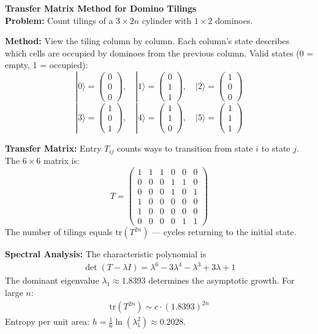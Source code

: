 \begin{technical}
{\Large\textbf{Transfer Matrix Method for Domino Tilings}}\\[0.7em]

\noindent\textbf{Problem:} Count tilings of a $3 \times 2n$ cylinder with $1 \times 2$ dominoes.

\noindent\textbf{Method:} View the tiling column by column. Each column's state describes which cells are occupied by dominoes from the previous column. Valid states (0 = empty, 1 = occupied):
\[
|0\rangle = \begin{pmatrix}0\\0\\0\end{pmatrix}, \quad
|1\rangle = \begin{pmatrix}0\\1\\1\end{pmatrix}, \quad
|2\rangle = \begin{pmatrix}1\\0\\0\end{pmatrix}
\]
\[
|3\rangle = \begin{pmatrix}1\\0\\1\end{pmatrix}, \quad
|4\rangle = \begin{pmatrix}1\\1\\0\end{pmatrix}, \quad
|5\rangle = \begin{pmatrix}1\\1\\1\end{pmatrix}
\]

\noindent\textbf{Transfer Matrix:} Entry $T_{ij}$ counts ways to transition from state $i$ to state $j$. The $6 \times 6$ matrix is:
\[
T = \begin{pmatrix}
1 & 1 & 1 & 0 & 0 & 0 \\
0 & 0 & 0 & 1 & 1 & 0 \\
0 & 0 & 0 & 1 & 0 & 1 \\
1 & 0 & 0 & 0 & 0 & 0 \\
1 & 0 & 0 & 0 & 0 & 0 \\
0 & 0 & 0 & 0 & 1 & 1
\end{pmatrix}
\]
The number of tilings equals $\text{tr}(T^{2n})$ — cycles returning to the initial state.

\noindent\textbf{Spectral Analysis:} The characteristic polynomial is
\begin{align}
\det(T - \lambda I) = \lambda^6 - 3\lambda^4 - \lambda^3 + 3\lambda + 1
\end{align}
The dominant eigenvalue $\lambda_1 \approx 1.8393$ determines the asymptotic growth. For large $n$:
\begin{align}
\text{tr}(T^{2n}) \sim c \cdot (1.8393)^{2n}
\end{align}
Entropy per unit area: $h = \frac{1}{6}\ln(\lambda_1^2) \approx 0.2028$.


\end{technical}
